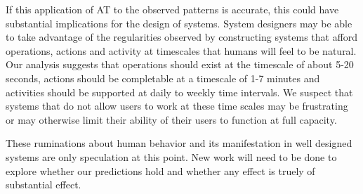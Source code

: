 If this application of AT to the observed patterns is accurate, this could have substantial implications for the design of systems.  System designers may be able to take advantage of the regularities observed by constructing systems that afford operations, actions and activity at timescales that humans will feel to be natural.  Our analysis suggests that operations should exist at the timescale of about 5-20 seconds, actions should be completable at a timescale of 1-7 minutes and activities should be supported at daily to weekly time intervals.  We suspect that systems that do not allow users to work at these time scales may be frustrating or may otherwise limit their ability of their users to function at full capacity.

These ruminations about human behavior and its manifestation in well designed systems are only speculation at this point.  New work will need to be done to explore whether our predictions hold and whether any effect is truely of substantial effect.
